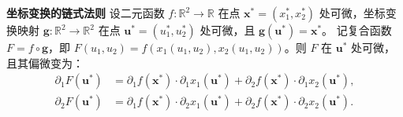 \documentclass[12pt,UTF8,fontset=none]{ctexbook}
\begin{document}

\begin{tm}{\textbf{坐标变换的链式法则}}
设二元函数 $f: \mathbb{R}^2 \to \mathbb{R}$ 在点 $\mathbf{x}^* = (x_1^*, x_2^*)$ 处可微，坐标变换映射 $\mathbf{g}: \mathbb{R}^2 \to \mathbb{R}^2$ 在点 $\mathbf{u}^* = (u_1^*, u_2^*)$ 处可微，且 $\mathbf{g}(\mathbf{u}^*) = \mathbf{x}^*$。
记复合函数 $F = f \circ \mathbf{g}$，即 $F(u_1, u_2) = f(x_1(u_1, u_2), x_2(u_1, u_2))$。则 $F$ 在 $\mathbf{u}^*$ 处可微，且其偏微变为：
\begin{align*}
\partial_1 F(\mathbf{u}^*) &= \partial_1 f(\mathbf{x}^*) \cdot \partial_1 x_1(\mathbf{u}^*) + \partial_2 f(\mathbf{x}^*) \cdot \partial_1 x_2(\mathbf{u}^*), \\
\partial_2 F(\mathbf{u}^*) &= \partial_1 f(\mathbf{x}^*) \cdot \partial_2 x_1(\mathbf{u}^*) + \partial_2 f(\mathbf{x}^*) \cdot \partial_2 x_2(\mathbf{u}^*).
\end{align*}
\end{tm}
\end{document}
